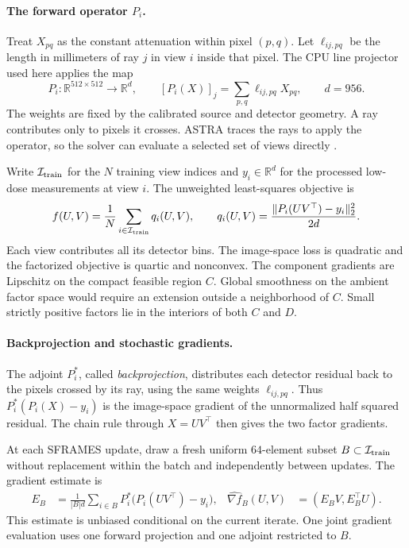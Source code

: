 \documentclass[11pt]{article}
\begin{document}
\paragraph{The forward operator \(P_i\).}
Treat \(X_{pq}\) as the constant attenuation within pixel \((p,q)\). Let \(\ell_{ij,pq}\) be the length in millimeters of ray \(j\) in view \(i\) inside that pixel. The CPU line projector used here applies the map
\begin{equation}
  P_i\colon\mathbb R^{512\times512}\longrightarrow\mathbb R^{d},
  \qquad
  [P_i(X)]_j=\sum_{p,q}\ell_{ij,pq}X_{pq},
  \qquad d=956 .
  \label{eq:ct-ray}
\end{equation}
The weights are fixed by the calibrated source and detector geometry. A ray contributes only to pixels it crosses. ASTRA traces the rays to apply the operator, so the solver can evaluate a selected set of views directly \cite{astra}.

Write \(\mathcal I_{\rm train}\) for the \(N\) training view indices and \(y_i\in\mathbb R^d\) for the processed low-dose measurements at view \(i\). The unweighted least-squares objective is
\begin{equation}
  f(U,V)=\frac{1}{N}\sum_{i\in\mathcal I_{\rm train}} q_i(U,V),
  \qquad
  q_i(U,V)=\frac{\|P_i(UV^\top)-y_i\|_2^2}{2d}.
  \label{eq:ct-loss}
\end{equation}
Each view contributes all its detector bins. The image-space loss is quadratic and the factorized objective is quartic and nonconvex. The component gradients are Lipschitz on the compact feasible region \(C\). Global smoothness on the ambient factor space would require an extension outside a neighborhood of \(C\). Small strictly positive factors lie in the interiors of both \(C\) and \(D\).

\paragraph{Backprojection and stochastic gradients.}
The adjoint \(P_i^\ast\), called \emph{backprojection}, distributes each detector residual back to the pixels crossed by its ray, using the same weights \(\ell_{ij,pq}\). Thus \(P_i^\ast(P_i(X)-y_i)\) is the image-space gradient of the unnormalized half squared residual. The chain rule through \(X=UV^\top\) then gives the two factor gradients.

At each SFRAMES update, draw a fresh uniform \(64\)-element subset \(B\subset\mathcal I_{\rm train}\) without replacement within the batch and independently between updates. The gradient estimate is
\begin{align}
  E_B &= \frac{1}{|B|d}\sum_{i\in B} P_i^\ast\bigl(P_i(UV^\top)-y_i\bigr),
  &
  \widehat{\nabla f}_B(U,V)&=(E_B V,E_B^\top U).
  \label{eq:ct-gradient}
\end{align}
This estimate is unbiased conditional on the current iterate. One joint gradient evaluation uses one forward projection and one adjoint restricted to \(B\).
\end{document}
